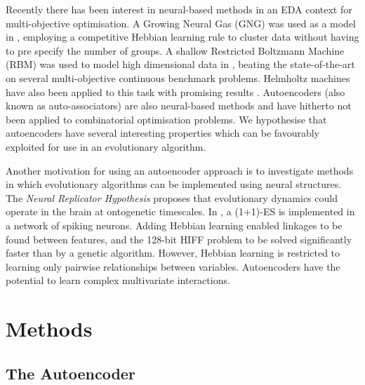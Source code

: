 \documentclass[twoside]{article}
\begin{document}
Recently there has been interest in neural-based methods in an EDA context for multi-objective optimisation. A Growing Neural Gas (GNG) was used as a model in \cite{marti2008introducing}, employing a competitive Hebbian learning rule to cluster data without having to pre specify the number of groups. A shallow Restricted Boltzmann Machine (RBM) was used to model high dimensional data in \cite{tang2010restricted}, beating the state-of-the-art on several multi-objective continuous benchmark problems. Helmholtz machines have also been applied to this task with promising results \cite{zhang2000bayesian}. Autoencoders (also known as auto-associators) are also neural-based methods and have hitherto not been applied to combinatorial optimisation problems. We hypothesise that autoencoders have several interesting properties which can be favourably exploited for use in an evolutionary algorithm. 

Another motivation for using an autoencoder approach is to investigate methods in which evolutionary algorithms can be implemented using neural structures. The {\em{Neural Replicator Hypothesis}} \cite{fernando2010neuronal} proposes that evolutionary dynamics could operate in the brain at ontogenetic timescales. In \cite{fernando2010neuronal}, a (1+1)-ES is implemented in a network of spiking neurons. Adding Hebbian learning enabled linkages to be found between features, and the 128-bit HIFF problem to be solved significantly faster than by a genetic algorithm. However, Hebbian learning is restricted to learning only pairwise relationships between variables. Autoencoders have the potential to learn complex multivariate interactions. 

\section{Methods}

\subsection{The Autoencoder}

\end{document}
